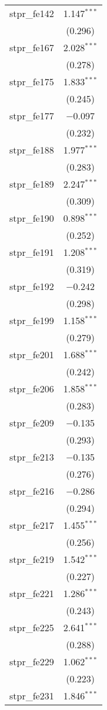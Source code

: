 \begin{table}[!htbp]
\begin{tabular}{@{\extracolsep{5pt}}lc}
  stpr\_fe142 & 1.147$^{***}$ \\ 
  & (0.296) \\ 
  stpr\_fe167 & 2.028$^{***}$ \\ 
  & (0.278) \\ 
  stpr\_fe175 & 1.833$^{***}$ \\ 
  & (0.245) \\ 
  stpr\_fe177 & $-$0.097 \\ 
  & (0.232) \\ 
  stpr\_fe188 & 1.977$^{***}$ \\ 
  & (0.283) \\ 
  stpr\_fe189 & 2.247$^{***}$ \\ 
  & (0.309) \\ 
  stpr\_fe190 & 0.898$^{***}$ \\ 
  & (0.252) \\ 
  stpr\_fe191 & 1.208$^{***}$ \\ 
  & (0.319) \\ 
  stpr\_fe192 & $-$0.242 \\ 
  & (0.298) \\ 
  stpr\_fe199 & 1.158$^{***}$ \\ 
  & (0.279) \\ 
  stpr\_fe201 & 1.688$^{***}$ \\ 
  & (0.242) \\ 
  stpr\_fe206 & 1.858$^{***}$ \\ 
  & (0.283) \\ 
  stpr\_fe209 & $-$0.135 \\ 
  & (0.293) \\ 
  stpr\_fe213 & $-$0.135 \\ 
  & (0.276) \\ 
  stpr\_fe216 & $-$0.286 \\ 
  & (0.294) \\ 
  stpr\_fe217 & 1.455$^{***}$ \\ 
  & (0.256) \\ 
  stpr\_fe219 & 1.542$^{***}$ \\ 
  & (0.227) \\ 
  stpr\_fe221 & 1.286$^{***}$ \\ 
  & (0.243) \\ 
  stpr\_fe225 & 2.641$^{***}$ \\ 
  & (0.288) \\ 
  stpr\_fe229 & 1.062$^{***}$ \\ 
  & (0.223) \\ 
  stpr\_fe231 & 1.846$^{***}$ \\ 

\end{tabular}
\end{table}
